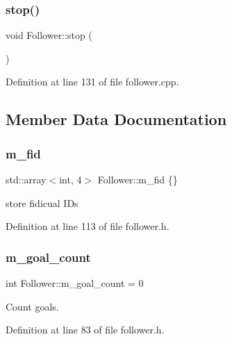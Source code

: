 \subsubsection{\texorpdfstring{stop()}{stop()}}
{\footnotesize\ttfamily void Follower\+::stop (\begin{DoxyParamCaption}{ }\end{DoxyParamCaption})}



Definition at line 131 of file follower.\+cpp.



\subsection{Member Data Documentation}
\mbox{\label{class_follower_a350054bbd7659d493cccc4b4ad9bc460}} 
\subsubsection{\texorpdfstring{m\+\_\+fid}{m\_fid}}
{\footnotesize\ttfamily std\+::array$<$int, 4$>$ Follower\+::m\+\_\+fid \{\}}



store fidicual I\+Ds 



Definition at line 113 of file follower.\+h.

\mbox{\label{class_follower_af53c7dcd8b5a99111bdfe0c8dd2015cf}} 
\subsubsection{\texorpdfstring{m\+\_\+goal\+\_\+count}{m\_goal\_count}}
{\footnotesize\ttfamily int Follower\+::m\+\_\+goal\+\_\+count = 0}



Count goals. 



Definition at line 83 of file follower.\+h.

\mbox{\label{class_follower_a6d4e1ebbe79cc8af601d53cba7aeb30a}} 

